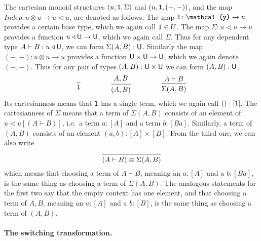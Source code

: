 \documentclass[11pt, one side, article]{memoir}
\theoremstyle{definition}
\theoremstyle{plain}
\newcommand{\Fun}[1]{\mathit{#1}}%
\newcommand{\tn}[1]{\textnormal{#1}}
\newcommand{\yon}{\mathcal{y}}
\newcommand{\0}{\textsf{0}}
\newcommand{\1}{\tn{\textsf{1}}}
\newcommand{\U}{\tn{\textsf{U}}}
\newcommand{\tri}{\mathbin{\triangleleft}}
\newcommand{\indep}{\Fun{Indep}}
\begin{document}
The cartesian monoid structures $(u,\1,\Sigma)$ and $(u,\1,(-,-))$, and the map $\indep\colon u\otimes u\to u\tri u$, are denoted as follows. The map $\1\colon\yon\to u$ provides a certain base type, which we again call $\1\in U$. The map $\Sigma\colon u\tri u\to u$ provides a function $u\tri\U\to\U$, which we again call $\Sigma$. Thus for any dependent type $A\vdash B:u\tri\U$, we can form $\Sigma(A,B):\U$. Similarly the map $(-,-)\colon u\otimes u\to u$ provides a function $\U\times \U\to\U$, which we again denote $(-,-)$. Thus for any pair of types $(A,B):\U\times \U$ we can form $(A,B):\U$. 
\[
  \begin{prooftree}
    \Infer0{\1}
  \end{prooftree}
  \hspace{.6in} 
  \begin{prooftree}
    \Hypo{A, B}
    \Infer1{(A,B)}
  \end{prooftree}
\hspace{.6in}
  \begin{prooftree}
    \Hypo{A\vdash B}
    \Infer1{\Sigma(A,B)}
  \end{prooftree}
\]
Its cartesianness means that $\1$ has a single term, which we again call $():[\1]$. The cartesianness of $\Sigma$ means that a term of $\Sigma(A,B)$ consists of an element of $u\tri u[(A\vdash B)]$, i.e.\ a term $a:[A]$ and a term $b:[Ba]$. Similarly, a term of $(A,B)$ consists of an element $(a,b):[A]\times[B]$. From the third one, we can also write
\begin{equation}\label{eqn.dep_vs_sigma}
\begin{prooftree}
  \Infer0{(A\vdash B)\equiv \Sigma(A,B)}
\end{prooftree}
\end{equation}
which means that choosing a term of $A\vdash B$, meaning an $a:[A]$ and a $b:[B a]$, is the same thing as choosing a term of $\Sigma(A,B)$. The analogous statements for the first two say that the empty context has one element, and that choosing a term of $A,B$, meaning an $a:[A]$ and a $b:[B]$, is the same thing as choosing a term of $(A,B)$.


\paragraph{The switching transformation.}
\end{document}
